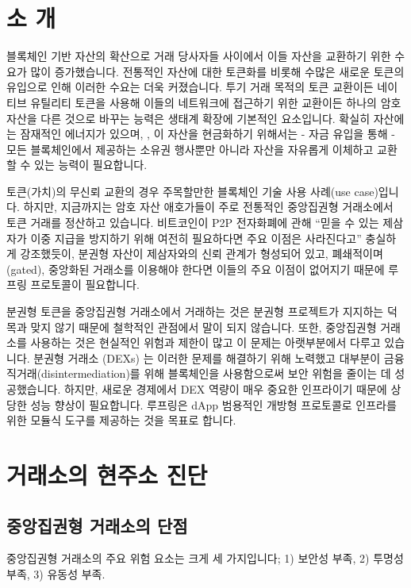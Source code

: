 \documentclass[UTF8,nofonts]{article}
\begin{document}
\begin{multicols}{2}
\section{소 개\label{sec:introduction}}

블록체인 기반 자산의 확산으로 거래 당사자들 사이에서 이들 자산을 교환하기 위한 수요가 많이 증가했습니다. 전통적인 자산에 대한 토큰화를 비롯해 수많은 새로운 토큰의 유입으로 인해 이러한 수요는 더욱 커졌습니다. 투기 거래 목적의 토큰 교환이든 네이티브 유틸리티 토큰을 사용해 이들의 네트워크에 접근하기 위한 교환이든 하나의 암호 자산을 다른 것으로 바꾸는 능력은 생태계 확장에 기본적인 요소입니다. 확실히 자산에는 잠재적인 에너지가 있으며, \cite{desotocapital}, 이 자산을 현금화하기 위해서는 - 자금 유입을 통해 - 모든 블록체인에서 제공하는 소유권 행사뿐만 아니라 자산을 자유롭게 이체하고 교환할 수 있는 능력이 필요합니다.

토큰(가치)의 무신뢰 교환의 경우 주목할만한 블록체인 기술 사용 사례(use case)입니다. 하지만, 지금까지는 암호 자산 애호가들이 주로 전통적인 중앙집권형 거래소에서 토큰 거래를 정산하고 있습니다. 비트코인이 \cite{nakamoto2008bitcoin} P2P 전자화폐에 관해 \enquote{믿을 수 있는 제삼자가 이중 지급을 방지하기 위해 여전히 필요하다면 주요 이점은 사라진다고} 충실하게 강조했듯이, 분권형 자산이 제삼자와의 신뢰 관계가 형성되어 있고, 폐쇄적이며(gated), 중앙화된 거래소를 이용해야 한다면 이들의 주요 이점이 없어지기 때문에 루프링 프로토콜이 필요합니다.

분권형 토큰을 중앙집권형 거래소에서 거래하는 것은 분권형 프로젝트가 지지하는 덕목과 맞지 않기 때문에 철학적인 관점에서 말이 되지 않습니다. 또한, 중앙집권형 거래소를 사용하는 것은 현실적인 위험과 제한이 많고 이 문제는 아랫부분에서 다루고 있습니다. 분권형 거래소 (DEXs) \cite{schuh2015bitshares} \cite{bancor} \cite{kyber}는 이러한 문제를 해결하기 위해 노력했고 대부분이 금융 직거래(disintermediation)를 위해 블록체인을 사용함으로써 보안 위험을 줄이는 데 성공했습니다. 하지만, 새로운 경제에서 DEX 역량이 매우 중요한 인프라이기 때문에 상당한 성능 향상이 필요합니다. 루프링은 dApp 범용적인 개방형 프로토콜로 인프라를 위한 모듈식 도구를 제공하는 것을 목표로 합니다.

\section{거래소의 현주소 진단\label{sec:current_exchange_landscape}}

\subsection{중앙집권형 거래소의 단점}
중앙집권형 거래소의 주요 위험 요소는 크게 세 가지입니다; 1) 보안성 부족, 2) 투명성 부족, 3) 유동성 부족.


\end{multicols}
\end{document}

